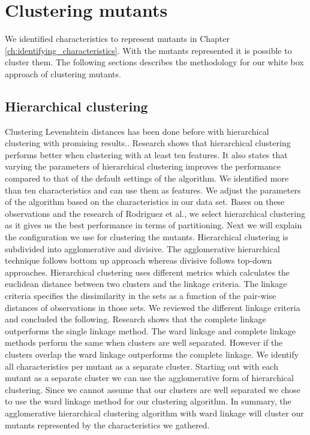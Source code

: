 \documentclass[../../main]{subfiles}
\begin{document}
\section{Clustering mutants}
\label{ch:clustering_characteristics}
We identified characteristics to represent mutants in Chapter \ref{ch:identifying_characteristics}.
With the mutants represented it is possible to cluster them.
The following sections describes the methodology for our white box approach of clustering mutants.

\subsection{Hierarchical clustering}
Clustering Levenshtein distances has been done before with hierarchical clustering with promising results.\cite{Rajalingam2011, Gothai2010PerformanceAlgorithms}. 
Research shows that hierarchical clustering performs better when clustering with at least ten features\cite{Rodriguez2019}.
It also states that varying the parameters of hierarchical clustering improves the performance compared to that of the default settings of the algorithm\cite{Rodriguez2019}.
We identified more than ten characteristics and can use them as features.
We adjust the parameters of the algorithm based on the characteristics in our data set.
Bases on these observations and the research of Rodriguez et al., we select hierarchical clustering as it gives us the best performance in terms of partitioning.
Next we will explain the configuration we use for clustering the mutants. 
\newline
Hierarchical clustering is subdivided into agglomerative and divisive. 
The agglomerative hierarchical technique follows bottom up approach whereas divisive follows top-down approaches.
Hierarchical clustering uses different metrics which calculates the euclidean distance between two clusters and the linkage criteria\cite{Rajalingam2011}. 
The linkage criteria specifies the dissimilarity in the sets as a function of the pair-wise distances of observations in those sets\cite{Rajalingam2011}.
We reviewed the different linkage criteria and concluded the following.
\newline
Research shows that the complete linkage outperforms the single linkage method\cite{Vijaya2019ComparativeClustering}.
The ward linkage and complete linkage methods perform the same when clusters are well separated\cite{Vijaya2019ComparativeClustering}.
However if the clusters overlap the ward linkage outperforms the complete linkage\cite{Vijaya2019ComparativeClustering}.
\newline
We identify all characteristics per mutant as a separate cluster.
Starting out with each mutant as a separate cluster we can use the agglomerative form of hierarchical clustering.
Since we cannot assume that our clusters are well separated we chose to use the ward linkage method for our clustering algorithm.
In summary, the agglomerative hierarchical clustering algorithm with ward linkage will cluster our mutants represented by the characteristics we gathered.
\end{document}
